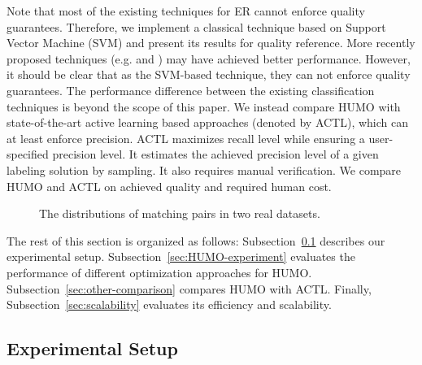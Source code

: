  Note that most of the existing techniques for ER cannot enforce quality guarantees. Therefore, we implement a classical technique based on Support Vector Machine (SVM) \cite{kopcke2010evaluation} and present its results for quality reference. More recently proposed techniques (e.g. \cite{kouki2017collective} and \cite{lacoste2013sigma}) may have achieved better performance. However, it should be clear that as the SVM-based technique, they can not enforce quality guarantees. The performance difference between the existing classification techniques is beyond the scope of this paper. We instead compare HUMO with state-of-the-art active learning based approaches \cite{arasu2010active, bellare2012active} (denoted by ACTL), which can at least enforce precision. ACTL maximizes recall level while ensuring a user-specified precision level. It estimates the achieved precision level of a given labeling solution by sampling. It also requires manual verification. We compare HUMO and ACTL on achieved quality and required human cost.

\begin{figure}
\setlength{\abovecaptionskip}{\figcaptionspace}
\centering
{}
\caption{The distributions of matching pairs in two real datasets.}
\label{fig:matching-distribution}
\vspace{-0.8cm}
\end{figure}

  The rest of this section is organized as follows: Subsection~\ref{sec:datasets} describes our experimental setup. Subsection~\ref{sec:HUMO-experiment} evaluates the performance of different optimization approaches for HUMO. Subsection~\ref{sec:other-comparison} compares HUMO with ACTL. Finally, Subsection~\ref{sec:scalability} evaluates its efficiency and scalability.
\vspace{-0.25cm} 
\subsection{\vspace{-0.15cm}Experimental Setup}
\label{sec:datasets}

